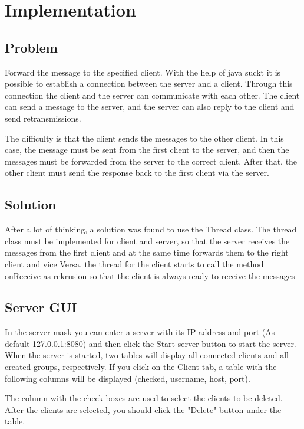 \newpage
\chapter{Implementation}
\section{Problem}


Forward the message to the specified client.
With the help of java suckt it is possible to establish a connection between the server and a client. Through this connection the client and the server can communicate with each other. 
The client can send a message to the server, and the server can also reply to the client and send retransmissions.

The difficulty is that the client sends the messages to the other client. 
In this case, the message must be sent from the first client to the server, and then the messages must be forwarded from the server to the correct client. 
After that, the other client must send the response back to the first client via the server.

\section{Solution}


After a lot of thinking, a solution was found to use the Thread class.
The thread class must be implemented for client and server, so that the server receives the messages
from the first client and at the same time forwards them to the right client and vice Versa.
the thread for the client starts to call the method onReceive as rekrusion so that the client is
always ready to receive the messages

\section{Server GUI}

In the server mask you can enter a server with its IP address and port (As default 127.0.0.1:8080)
and then click the Start server button to start the server. 
When the server is started, two tables will display all connected clients and all created groups, respectively.
If you click on the Client tab, a table with the following columns will be displayed (checked, username, host, port).
\medskip

\noindent
The column with the check boxes are used to select the clients to be deleted. 
After the clients are selected, you should click the "Delete" button under the table.

